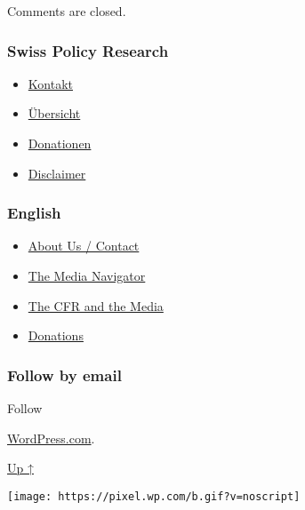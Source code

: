 Comments are closed.

\hypertarget{swiss-policy-research}{%
\subsubsection{Swiss Policy Research}\label{swiss-policy-research}}

\begin{itemize}
\tightlist
\item
  \href{https://swprs.org/kontakt/}{Kontakt}
\item
  \href{https://swprs.org/uebersicht/}{Übersicht}
\item
  \href{https://swprs.org/donationen/}{Donationen}
\item
  \href{https://swprs.org/disclaimer/}{Disclaimer}
\end{itemize}

\hypertarget{english}{%
\subsubsection{English}\label{english}}

\begin{itemize}
\tightlist
\item
  \href{https://swprs.org/contact/}{About Us / Contact}
\item
  \href{https://swprs.org/media-navigator/}{The Media Navigator}
\item
  \href{https://swprs.org/the-american-empire-and-its-media/}{The CFR
  and the Media}
\item
  \href{https://swprs.org/donations/}{Donations}
\end{itemize}

\hypertarget{follow-by-email}{%
\subsubsection{Follow by email}\label{follow-by-email}}

Follow

\href{https://wordpress.com/?ref=footer_custom_com}{WordPress.com}.

\protect\hyperlink{}{Up ↑}

\texttt{[image: https://pixel.wp.com/b.gif?v=noscript]}
